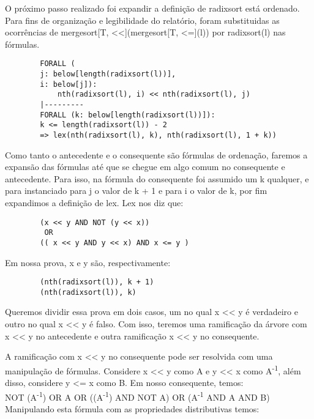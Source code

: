 \documentclass[12pt]{article}
\begin{document}
        O próximo passo realizado foi expandir a definição de radixsort está ordenado. Para fins de organização e legibilidade do relatório, foram substituidas as ocorrências de mergesort[T, <<](mergesort[T, <=](l)) por radixsort(l) nas fórmulas.
        
        \begin{verbatim}
        FORALL (
        j: below[length(radixsort(l))],
        i: below[j]): 
            nth(radixsort(l), i) << nth(radixsort(l), j)
        |---------
        FORALL (k: below[length(radixsort(l))]):
        k <= length(radixsort(l)) - 2 
        => lex(nth(radixsort(l), k), nth(radixsort(l), 1 + k))
        \end{verbatim}
        
        Como tanto o antecedente e o consequente são fórmulas de ordenação, faremos a expansão das fórmulas até que se chegue em algo comum no consequente e antecedente. Para isso, na fórmula do consequente foi assumido um k qualquer, e para instanciado para j o valor de k + 1 e para i o valor de k, por fim expandimos a definição de lex. Lex nos diz que:
        \begin{verbatim}
        (x << y AND NOT (y << x))  
         OR 
        (( x << y AND y << x) AND x <= y )
        \end{verbatim}
        
        Em nossa prova, x e y são, respectivamente:
        \begin{verbatim}
        (nth(radixsort(l)), k + 1)
        (nth(radixsort(l)), k)
        \end{verbatim}
        
        Queremos dividir essa prova em dois casos, um no qual x << y é verdadeiro e outro no qual x << y é falso. Com isso, teremos uma ramificação da árvore com x << y no antecedente e outra ramificação x << y no consequente.
        
        A ramificação com x << y no consequente pode ser resolvida com uma manipulação de fórmulas. Considere x << y como A e y << x como A\textsuperscript{-1}, além disso, considere y <= x como B. Em nosso consequente, temos:
        \\
        
        NOT (A\textsuperscript{-1}) OR A OR ((A\textsuperscript{-1}) AND NOT A) OR       (A\textsuperscript{-1} AND A AND B) \\
        
        Manipulando esta fórmula com as propriedades distributivas temos:
        \\
        
\end{document}
